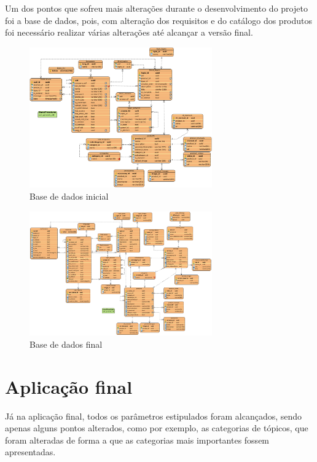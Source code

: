 Um dos pontos que sofreu mais alterações durante o desenvolvimento do projeto foi a base de dados, pois, com alteração dos requisitos e do catálogo dos produtos foi necessário realizar várias alterações até alcançar a versão final.

\begin{figure}[htb]
 \centering
 \includegraphics[width=0.7\textwidth]{images/diagramas/diagrama_bd.png}
 \caption{Base de dados inicial}
 \label{fig:79}
\end{figure}

\begin{figure}[htb]
 \centering
 \includegraphics[width=0.7\textwidth]{images/diagramas/bd_final.png}
 \caption{Base de dados final}
 \label{fig:80}
\end{figure}


\section{Aplicação final}
Já na aplicação final, todos os parâmetros estipulados foram alcançados, sendo apenas alguns pontos alterados, como por exemplo, as categorias de tópicos, que foram alteradas de forma a que as categorias mais importantes fossem apresentadas.


